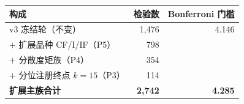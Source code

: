 \begin{tabular}{lrr}
\toprule
构成 & 检验数 & Bonferroni 门槛 \\
\midrule
v3 冻结轮（不变） & 1,476 & 4.146 \\
$+$ 扩展品种 CF/I/IF（P5） & 798 & \\
$+$ 分散度矩族（P4） & 354 & \\
$+$ 分位注册终点 $k{=}15$（P3） & 114 & \\
\midrule
\textbf{扩展主族合计} & \textbf{2,742} & \textbf{4.285} \\
\bottomrule
\end{tabular}

